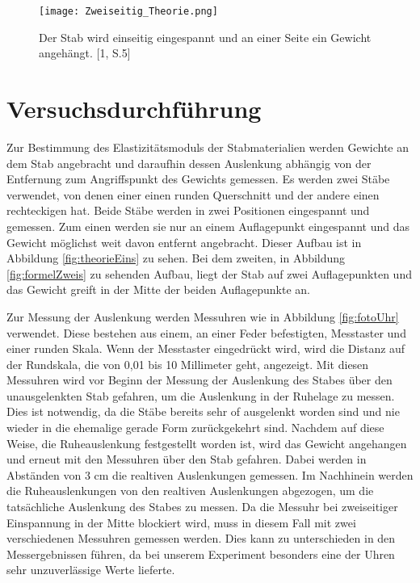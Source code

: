 \documentclass[titlepage = firstcover]{scrartcl}
\begin{document}
          \begin{figure}[h]
            \centering
            \texttt{[image: Zweiseitig\_Theorie.png]}
            \caption{Der Stab wird einseitig eingespannt und an einer Seite ein Gewicht angehängt. [1, S.5]}
            \label{fig:theorieZwei}
          \end{figure}
      

    \section{Versuchsdurchführung}
      Zur Bestimmung des Elastizitätsmoduls der Stabmaterialien werden Gewichte an dem Stab angebracht und daraufhin dessen Auslenkung abhängig von der Entfernung
      zum Angriffspunkt des Gewichts gemessen. Es werden zwei Stäbe verwendet, von denen einer einen runden Querschnitt und der andere einen rechteckigen hat. Beide
      Stäbe werden in zwei Positionen eingespannt und gemessen. Zum einen werden sie nur an einem Auflagepunkt eingespannt und das Gewicht möglichst weit davon entfernt
      angebracht. Dieser Aufbau ist in Abbildung \ref{fig:theorieEins} zu sehen. Bei dem zweiten, in Abbildung \ref{fig:formelZweis} zu sehenden Aufbau, liegt der Stab auf zwei Auflagepunkten und das
      Gewicht greift in der Mitte der beiden Auflagepunkte an.\newline

      Zur Messung der Auslenkung werden Messuhren wie in Abbildung \ref{fig:fotoUhr} verwendet. Diese bestehen aus einem, an einer Feder befestigten, Messtaster und einer runden Skala. Wenn der 
      Messtaster eingedrückt wird, wird die Distanz auf der Rundskala, die von 0,01 bis 10 Millimeter geht, angezeigt. Mit diesen Messuhren wird vor Beginn der
      Messung der Auslenkung des Stabes über den unausgelenkten Stab gefahren, um die Auslenkung in der Ruhelage zu messen. Dies ist notwendig, da die Stäbe 
      bereits sehr of ausgelenkt worden sind und nie wieder in die ehemalige gerade Form zurückgekehrt sind. Nachdem auf diese Weise, die Ruheauslenkung 
      festgestellt worden ist, wird das Gewicht angehangen und erneut mit den Messuhren über den Stab gefahren. Dabei werden in Abständen von 3 cm die realtiven 
      Auslenkungen gemessen. Im Nachhinein werden die Ruheauslenkungen von den realtiven Auslenkungen abgezogen, um die tatsächliche Auslenkung des Stabes zu
      messen. Da die Messuhr bei zweiseitiger Einspannung in der Mitte blockiert wird, muss in diesem Fall mit zwei verschiedenen Messuhren gemessen werden. Dies
      kann zu unterschieden in den Messergebnissen führen, da bei unserem Experiment besonders eine der Uhren sehr unzuverlässige Werte lieferte.
      
\end{document}
